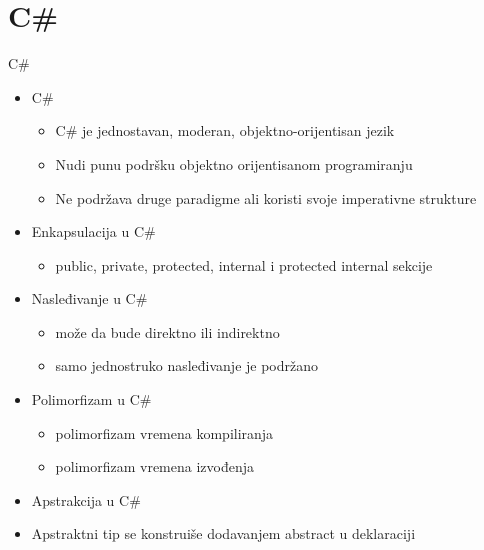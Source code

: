 \documentclass[14pt,aspectratio=169]{beamer}
\begin{document}
\section{C\#}
\begin{frame}[fragile]{C\#}
\begin{itemize}
\item C\# 
	\begin{itemize}
		\item C\# je jednostavan, moderan, objektno-orijentisan jezik
		\item Nudi punu podršku objektno orijentisanom programiranju
		\item Ne podržava druge paradigme ali koristi svoje imperativne strukture
	\end{itemize}
\item Enkapsulacija u C\#
	\begin{itemize}
		\item public, private, protected, internal i protected internal sekcije
	\end{itemize}
\item Nasleđivanje u C\#
	\begin{itemize}
		\item može da bude direktno ili indirektno
		\item samo jednostruko nasleđivanje je podržano
	\end{itemize}
\item Polimorfizam u C\#
	\begin{itemize}
		\item polimorfizam vremena kompiliranja
		\item polimorfizam vremena izvođenja
	\end{itemize}
\item Apstrakcija u C\#
                  \item Apstraktni tip se konstruiše dodavanjem abstract u deklaraciji
\end{itemize}
\end{frame}
\end{document}
